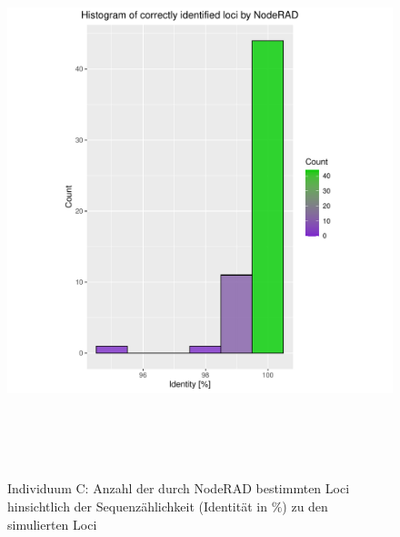 \begin{figure}[H]
	\begin{center}
		\includegraphics[height=16cm]{bilder/evaluation/hist_perc_ident/C.plot_hist.pdf}
		\caption{Individuum C: Anzahl der durch NodeRAD bestimmten Loci hinsichtlich der Sequenzählichkeit (Identität in $ \% $) zu den simulierten Loci}
	\end{center}
\end{figure}

